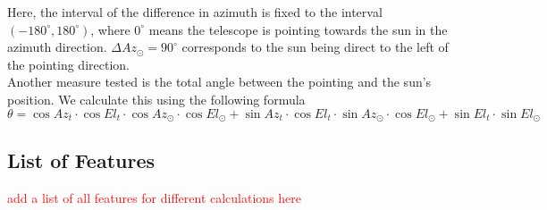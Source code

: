 Here, the interval of the difference in azimuth is fixed to the interval $(-180^\circ,180^\circ)$,
where $0^\circ$ means the telescope is pointing towards the sun in the azimuth direction.
$\Delta \textit{Az}_\odot = 90^\circ$ corresponds to the sun being direct to the left of the pointing direction. \\

Another measure tested is the total angle between the pointing and the sun's position. We calculate this using the following formula
\begin{equation}
    \theta = \cos \textit{Az}_t \cdot \cos \textit{El}_t\cdot \cos \textit{Az}_\odot \cdot \cos \textit{El}_\odot + \sin \textit{Az}_t \cdot \cos \textit{El}_t\cdot \sin \textit{Az}_\odot \cdot \cos \textit{El}_\odot + \sin \textit{El}_t \cdot \sin \textit{El}_\odot
\end{equation}

\subsection{List of Features}
\textcolor{red}{add a list of all features for different calculations here}



